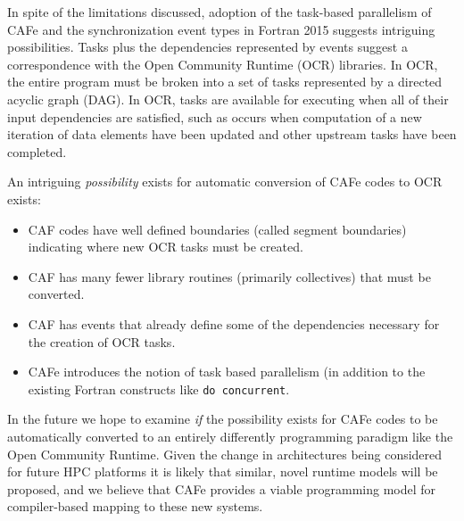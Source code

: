 In spite of the limitations discussed, 
adoption of the task-based parallelism of CAFe and the synchronization
event types in Fortran 2015 suggests intriguing possibilities.  Tasks plus the
dependencies represented by events suggest a correspondence with the Open Community
Runtime (OCR) libraries.  In OCR, the entire program must be broken into a set of tasks
represented by a directed acyclic graph (DAG).  In OCR, tasks are available for executing
when all of their input dependencies are satisfied, such as occurs when computation of a new
iteration of data elements have been updated and other upstream tasks have been completed.


An intriguing \emph{possibility} exists for automatic conversion of CAFe codes to OCR exists:
\begin{itemize}
\item
  CAF codes have well defined boundaries (called segment boundaries) indicating where new
  OCR tasks must be created.
\item
  CAF has many fewer library routines (primarily collectives) that must be converted.
\item
  CAF has events that already define some of the dependencies necessary for the creation
  of OCR tasks.
\item
  CAFe introduces the notion of task based parallelism (in addition to the existing
  Fortran constructs like \texttt{do concurrent}.
\end{itemize}

In the future we hope to examine \emph{if} the possibility exists for CAFe codes to be
automatically converted to an entirely differently programming paradigm like
the Open Community Runtime.  Given the change in architectures being considered for
future HPC platforms it is likely that similar, novel runtime models will be proposed,
and we believe that CAFe provides a viable programming model for compiler-based mapping to
these new systems.

